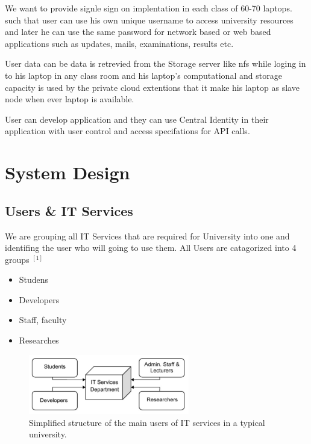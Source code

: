 \documentclass[12pt]{report}
\begin{document}
	We want to provide signle sign on implentation in each class of 60-70 laptops. such that user can use his own unique username to access university resources and later he can use the same password for network based or web based applications such as updates, mails, examinations, results etc.\newline
	
	User data can be data is retrevied from the Storage server like nfs while loging in to his laptop in any class room and his laptop's computational and storage capacity is used by the private cloud extentions that it make his laptop as slave node when ever laptop is available.\newline 
	
	User can develop application and they can use Central Identity in their application with user control and access specifations for API calls.


\chapter{System Design}
	
\section{Users \& IT Services}

	We are grouping all IT Services that are required for University into one and identifing the user who will going to use them. All Users are catagorized into 4 groups $ ^{[1]}$
	
	\begin{itemize}
	\item Studens
	\item Developers
	\item Staff, faculty
	\item Researches
	\end{itemize}
	
\begin{figure}[H]
\begin{center}
\includegraphics[width=7cm]{./it.png}
\caption{ Simplified structure of the main users of IT services in a typical university. \label{fig:Simplified structure of the main users of IT services in a typical university. }}
\end{center}
\end{figure}
	
\end{document}
